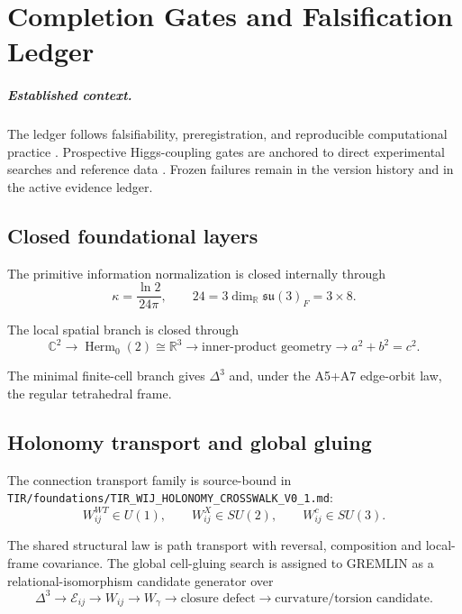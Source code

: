 \chapter{Completion Gates and Falsification Ledger}
\label{ch:open_problems}

\paragraph{Established context.}
The ledger follows falsifiability, preregistration, and reproducible
computational practice
\cite{Popper1959,Lakatos1978,Sandve2013,Wilson2014,Munafo2017,Nosek2018,Stark2018}.
Prospective Higgs-coupling gates are anchored to direct experimental searches
and reference data \cite{ATLAS2022Charm,PDG2024}.  Frozen failures remain in the
version history and in the active evidence ledger.

\section{Closed foundational layers}

The primitive information normalization is closed internally through
\[
\kappa=\frac{\ln2}{24\pi},
\qquad
24=3\dim_{\mathbb R}\mathfrak{su}(3)_F=3\times8.
\]

The local spatial branch is closed through
\[
\mathbb C^2
\longrightarrow
\operatorname{Herm}_0(2)\cong\mathbb R^3
\longrightarrow
\text{inner-product geometry}
\longrightarrow
a^2+b^2=c^2.
\]

The minimal finite-cell branch gives $\Delta^3$ and, under the A5+A7 edge-orbit
law, the regular tetrahedral frame.

\section{Holonomy transport and global gluing}

The connection transport family is source-bound in
\texttt{TIR/foundations/TIR\_WIJ\_HOLONOMY\_CROSSWALK\_V0\_1.md}:
\[
W_{ij}^{WT}\in U(1),
\qquad
W_{ij}^{X}\in SU(2),
\qquad
W_{ij}^{c}\in SU(3).
\]

The shared structural law is path transport with reversal, composition and
local-frame covariance.  The global cell-gluing search is assigned to GREMLIN
as a relational-isomorphism candidate generator over
\[
\Delta^3
\to\mathcal E_{ij}
\to W_{ij}
\to W_\gamma
\to\text{closure defect}
\to\text{curvature/torsion candidate}.
\]

